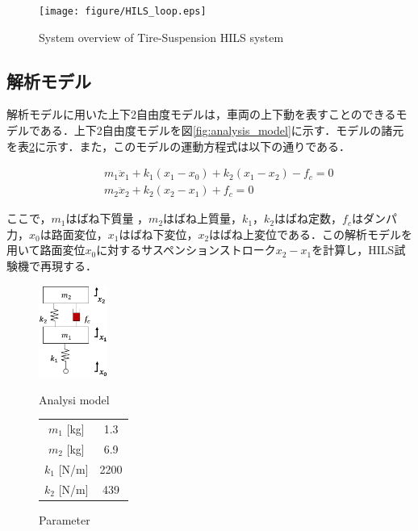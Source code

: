 \documentclass{article_vdlab_sotsuron_youshi}
\begin{document}
\vspace*{3mm}
\begin{figure}[H]
  \begin{center}
    \texttt{[image: figure/HILS\_loop.eps]}
    \vspace*{-1mm}
    \caption{System overview of Tire-Suspension HILS system}
    \label{fig:HILS}
  \end{center}
\end{figure}

\newpage
\subsection{解析モデル}
解析モデルに用いた上下2自由度モデルは，車両の上下動を表すことのできるモデルである\cite{2dof}．上下2自由度モデルを図\ref{fig:analysis_model}に示す．モデルの諸元を表\ref{tab:analysis_parameter}に示す．また，このモデルの運動方程式は以下の通りである．

\noindent
\begin{eqnarray}
 \label{eq:2dof_m1} &&m_1\ddot x_1 + k_1(x_1-x_0) + k_2(x_1-x_2) - f_c = 0\\
 \label{eq:2dof_m2} &&m_2\ddot x_2 + k_2(x_2-x_1) + f_c = 0
\end{eqnarray}

ここで，$m_1$はばね下質量 ，$m_2$はばね上質量，$k_1$，$k_2$はばね定数，$f_c$はダンパ力，$x_0$は路面変位，$x_1$はばね下変位，$x_2$はばね上変位である．この解析モデルを用いて路面変位$x_0$に対するサスペンションストローク$x_2-x_1$を計算し，HILS試験機で再現する．

\begin{figure}[H]
  \begin{minipage}{0.5\hsize}
    \begin{center}
      \includegraphics[height=30mm]{figure/analysis_model.eps}
      \caption{Analysi model}
    \label{fig:analysis_model}
    \end{center}
  \end{minipage}
  \begin{minipage}{0.35\hsize}
      \begin{center}
	\makeatletter
	\def\@captype{table}
	\makeatother
	\caption{Parameter}
	\label{tab:analysis_parameter}
	  \begin{tabular}{cc}\hline
	    $m_1$ [kg] & 1.3\\
	    $m_2$ [kg] & 6.9\\
	    $k_1$ [N/m] & 2200\\
	    $k_2$ [N/m] & 439\\\hline
	  \end{tabular}
      \end{center}
  \end{minipage}
\end{figure}
\end{document}
